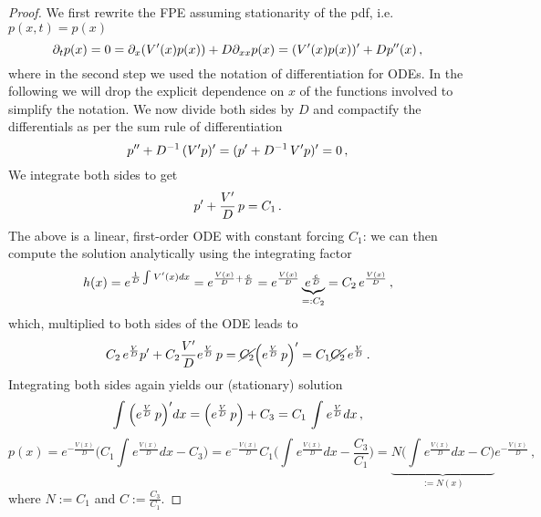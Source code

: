 \documentclass[../main.tex]{subfiles}
\begin{document}
\begin{proof}
     We first rewrite the FPE assuming stationarity of the pdf, i.e. $p(x,t)=p(x)$
     \begin{equation*}
          \partial_{t}p(x) = 0 = \partial_{x}(V'(x)p(x)) + D\partial_{xx}p(x) = (V'(x)p(x))' + D p''(x)\,,
     \end{equation*}
     where in the second step we used the notation of differentiation for ODEs.
     In the following we will drop the explicit dependence on $x$ of the functions involved to simplify the notation.
     We now divide both sides by $D$ and compactify the differentials as per the sum rule of differentiation 
     \begin{equation*}
             p''+D^{-1}\,(V'p)'=(p' + D^{-1}\,V'p)'=0\,,
     \end{equation*}
     We integrate both sides to get
     \begin{equation*}
         p'+\frac{V'}{D}\,p = C_{1}\,. 
     \end{equation*}
     The above is a linear, first-order ODE with constant forcing $C_{1}$: we can then compute the solution analytically \cite[Theorem 2.1, p.1]{DynSys} using the integrating factor
     \begin{equation*}
             h(x) = e^{\frac{1}{D}\int_{}^{}V'(x)dx} = e^{\frac{V(x)}{D}+\frac{c}{D}} = e^{\frac{V(x)}{D}}\underbrace{e^{\frac{c}{D}}}_{=:C_{2}} = C_{2}\,e^{\frac{V(x)}{D}}\,,
     \end{equation*}
     which, multiplied to both sides of the ODE leads to 
     \begin{equation*}
             C_{2}\,e^{\frac{V}{D}}p' + C_{2}\frac{V'}{D}e^{\frac{V}{D}}\,p = \cancel{C_{2}}\Big(e^{\frac{V}{D}}\,p\Big)' = C_{1}\cancel{C_{2}}\,e^{\frac{V}{D}}\,.
     \end{equation*}
     Integrating both sides again yields our (stationary) solution
     \begin{equation*}
          \int_{}^{}\Big(e^{\frac{V}{D}}\,p\Big)'dx = \Big(e^{\frac{V}{D}}\,p\Big) + C_{3} = C_{1}\,\int_{}^{}e^{\frac{V}{D}}dx\,,
     \end{equation*}
     \begin{equation*}
             p(x) = e^{-\frac{V(x)}{D}}\bigg(C_{1}\int_{}^{}e^{\frac{V(x)}{D}}dx - C_{3}\bigg) = e^{-\frac{V(x)}{D}}C_{1}\bigg(\int_{}^{}e^{\frac{V(x)}{D}}dx - \frac{C_{3}}{C_{1}}\bigg) = \underbrace{N\bigg(\int_{}^{}e^{\frac{V(x)}{D}}dx - C \bigg)}_{:=N(x)}e^{-\frac{V(x)}{D}}\,,
     \end{equation*}
     where $N:=C_{1}$ and $C:=\frac{C_{3}}{C_{1}}$.
\end{proof}

\end{document}
